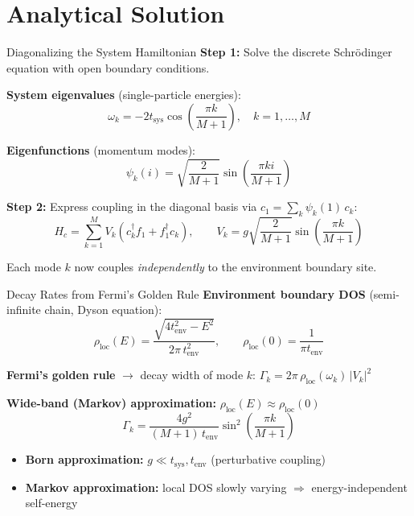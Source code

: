 \documentclass[aspectratio=169,11pt]{beamer}
\begin{document}
\section{Analytical Solution}

\begin{frame}{Diagonalizing the System Hamiltonian}
\small
    \textbf{Step 1:} Solve the discrete Schr\"odinger equation with open boundary conditions.

    \vspace{-0.1cm}
    \textbf{System eigenvalues} (single-particle energies):
    \[
        \omega_k = -2t_{\mathrm{sys}}\cos\!\left(\frac{\pi k}{M+1}\right), \quad k = 1,\ldots,M
    \]

    \textbf{Eigenfunctions} (momentum modes):
    \[
        \psi_k(i) = \sqrt{\frac{2}{M+1}}\sin\!\left(\frac{\pi k i}{M+1}\right)
    \]

    \textbf{Step 2:} Express coupling in the diagonal basis via $c_1 = \sum_k \psi_k(1)\, c_k$:
    \[
        H_c = \sum_{k=1}^M V_k(c_k^\dagger f_1 + f_1^\dagger c_k), \qquad V_k = g\sqrt{\frac{2}{M+1}}\sin\!\left(\frac{\pi k}{M+1}\right)
    \]
    \vspace{-0.3cm}

    Each mode $k$ now couples \emph{independently} to the environment boundary site.
\end{frame}

\begin{frame}{Decay Rates from Fermi's Golden Rule}
\small
    \textbf{Environment boundary DOS} (semi-infinite chain, Dyson equation):
    \[
        \rho_{\mathrm{loc}}(E) = \frac{\sqrt{4t_{\mathrm{env}}^2 - E^2}}{2\pi\, t_{\mathrm{env}}^2}, \qquad \rho_{\mathrm{loc}}(0) = \frac{1}{\pi t_{\mathrm{env}}}
    \]

    \textbf{Fermi's golden rule} $\to$ decay width of mode $k$:
    $\Gamma_k = 2\pi\,\rho_{\mathrm{loc}}(\omega_k)\,|V_k|^2$

    \textbf{Wide-band (Markov) approximation:} $\rho_{\mathrm{loc}}(E) \approx \rho_{\mathrm{loc}}(0)$
    \[
        \boxed{\Gamma_k = \frac{4g^2}{(M+1)\,t_{\mathrm{env}}} \sin^2\!\left(\frac{\pi k}{M+1}\right)}
    \]

    \begin{itemize}\setlength{\itemsep}{1pt}
        \item \textbf{Born approximation:} $g \ll t_{\mathrm{sys}}, t_{\mathrm{env}}$ (perturbative coupling)
        \item \textbf{Markov approximation:} local DOS slowly varying $\Rightarrow$ energy-independent self-energy
    \end{itemize}
\end{frame}
\end{document}
